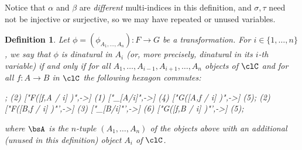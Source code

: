 \documentclass[11pt]{amsart}
\newcommand{\subst}[3]{{{\boldsymbol{#1}}[#2/#3}]} %
\newcommand{\substMV}[4]{{{\boldsymbol{#1}}[#2,#3 / #4]}}
\newtheorem{definition}{Definition}
\begin{document}
Notice that \(\alpha\) and \(\beta\) are \emph{different} multi-indices in this definition, and \(\sigma,\tau\) need not be injective or surjective, so we may have repeated or unused variables.
\begin{definition}\label{def:dinaturality in i-th variable}
	Let $\phi = (\phi_{A_1,\dots,A_n}) : F \to G$ be a transformation. For $i \in \{1,\dots,n\}$, we say that $\phi$ is \emph{dinatural in $A_i$} (or, more precisely, \emph{dinatural in its $i$-th variable}) if and only if for all $A_1,\dots,A_{i-1}, A_{i+1},\dots,A_n$ objects of $\clC$ and for all $f : A \to B$ in $\clC$ the following hexagon commutes:

	{\footnotesize
	\begin{center}
		\begin{codi}
			\obj [hexagonal=horizontal side 2cm angle 60]
			{
				|(1)| F(\subst \bsA A i \sigma) && |(4)| G(\subst \bsA A i \tau) & \\
				|(2)| F(\substMV \bsA B A i \sigma) &&&  |(5)| G(\substMV \bsA A B i \tau) \\
				|(3)| F(\subst \bsA B i \sigma) && |(6)| G(\subst \bsA B i \tau) & \\
			};
			\mor (2) ["F(\substMV \bsA f A i \sigma)",->] (1) ["\phi_{\subst \bsA A i}",->]  (4) ["G(\substMV \bsA A f i \tau)",->] (5);
			\mor (2) ["F(\substMV \bsA B f i \sigma)"',->] (3) ["\phi_{\subst \bsA B i}"',->] (6) ["G(\substMV \bsA f B i \tau)"',->] (5);
		\end{codi}
	\end{center}
	}
	where $\bsA$ is the $n$-tuple $(A_1,\dots,A_n)$ of the objects above with an additional (unused in this definition) object $A_i$ of $\clC$.
\end{definition}
\end{document}
